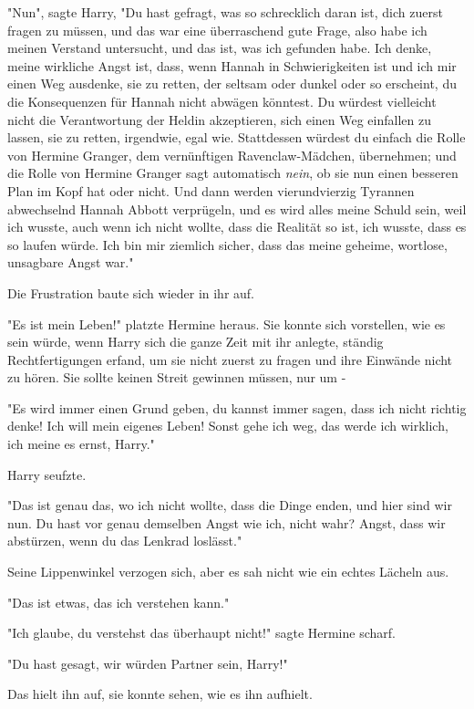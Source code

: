{"Nun", sagte Harry, "Du hast gefragt, was so schrecklich daran ist, dich zuerst fragen zu müssen, und das war eine überraschend gute Frage, also habe ich meinen Verstand untersucht, und das ist, was ich gefunden habe. Ich denke, meine wirkliche Angst ist, dass, wenn Hannah in Schwierigkeiten ist und ich mir einen Weg ausdenke, sie zu retten, der seltsam oder dunkel oder so erscheint, du die Konsequenzen für Hannah nicht abwägen könntest. Du würdest vielleicht nicht die Verantwortung der Heldin akzeptieren, sich einen Weg einfallen zu lassen, sie zu retten, irgendwie, egal wie. Stattdessen würdest du einfach die Rolle von Hermine Granger, dem vernünftigen Ravenclaw-Mädchen, übernehmen; und die Rolle von Hermine Granger sagt automatisch \emph{nein}, ob sie nun einen besseren Plan im Kopf hat oder nicht. Und dann werden vierundvierzig Tyrannen abwechselnd Hannah Abbott verprügeln, und es wird alles meine Schuld sein, weil ich wusste, auch wenn ich nicht wollte, dass die Realität so ist, ich wusste, dass es so laufen würde. Ich bin mir ziemlich sicher, dass das meine geheime, wortlose, unsagbare Angst war."

Die Frustration baute sich wieder in ihr auf.

"Es ist mein Leben!" platzte Hermine heraus. Sie konnte sich vorstellen, wie es sein würde, wenn Harry sich die ganze Zeit mit ihr anlegte, ständig Rechtfertigungen erfand, um sie nicht zuerst zu fragen und ihre Einwände nicht zu hören. Sie sollte keinen Streit gewinnen müssen, nur um -

"Es wird immer einen Grund geben, du kannst immer sagen, dass ich nicht richtig denke! Ich will mein eigenes Leben! Sonst gehe ich weg, das werde ich wirklich, ich meine es ernst, Harry."

Harry seufzte.

"Das ist genau das, wo ich nicht wollte, dass die Dinge enden, und hier sind wir nun. Du hast vor genau demselben Angst wie ich, nicht wahr? Angst, dass wir abstürzen, wenn du das Lenkrad loslässt."

Seine Lippenwinkel verzogen sich, aber es sah nicht wie ein echtes Lächeln aus.

"Das ist etwas, das ich verstehen kann."

"Ich glaube, du verstehst das überhaupt nicht!" sagte Hermine scharf.

"Du hast gesagt, wir würden Partner sein, Harry!"

Das hielt ihn auf, sie konnte sehen, wie es ihn aufhielt.

}
